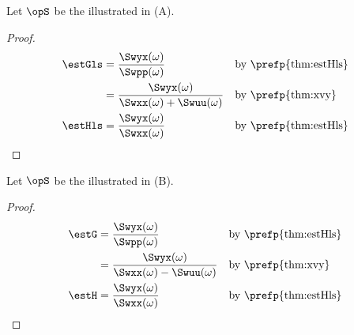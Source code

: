 \begin{corollary}
\label{cor:estHls_A}
Let $\opS$ be the  illustrated in  (A).
\end{corollary}
\begin{proof}
\begin{align*}
  \estGls
    &= \frac{\Swyx(\omega)}{\Swpp(\omega)}
    && \text{by \prefp{thm:estHls}}
  \\&= \frac{\Swyx(\omega)}{\Swxx(\omega)+\Swuu(\omega)}
    && \text{by \prefp{thm:xvy}}
  \\
  \estHls
    &= \frac{\Swyx(\omega)}{\Swxx(\omega)}
    && \text{by \prefp{thm:estHls}}
\end{align*}
\end{proof}

\begin{corollary}
\label{cor:estHls_B}
Let $\opS$ be the  illustrated in  (B).
\end{corollary}
\begin{proof}
\begin{align*}
  \estG
    &= \frac{\Swyx(\omega)}{\Swpp(\omega)}
    && \text{by \prefp{thm:estHls}}
  \\&= \frac{\Swyx(\omega)}{\Swxx(\omega)-\Swuu(\omega)}
    && \text{by \prefp{thm:xvy}}
  \\
  \estH &= \frac{\Swyx(\omega)}{\Swxx(\omega)}
    && \text{by \prefp{thm:estHls}}
\end{align*}
\end{proof}

